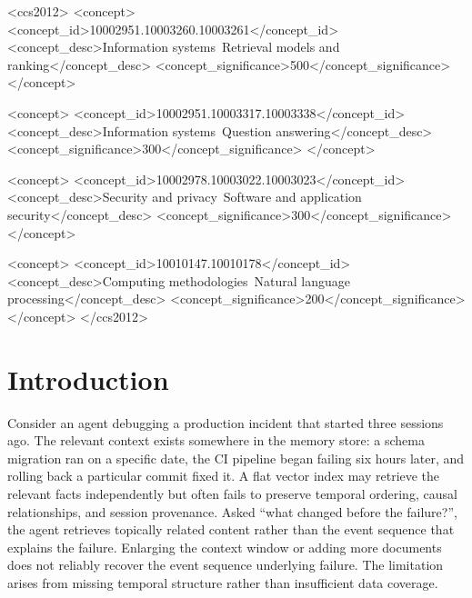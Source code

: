 \documentclass[sigconf]{acmart}
\begin{document}
\begin{CCSXML}
<ccs2012>
 <concept>
  <concept_id>10002951.10003260.10003261</concept_id>
  <concept_desc>Information systems~Retrieval models and ranking</concept_desc>
  <concept_significance>500</concept_significance>
 </concept>

 <concept>
  <concept_id>10002951.10003317.10003338</concept_id>
  <concept_desc>Information systems~Question answering</concept_desc>
  <concept_significance>300</concept_significance>
 </concept>

 <concept>
  <concept_id>10002978.10003022.10003023</concept_id>
  <concept_desc>Security and privacy~Software and application security</concept_desc>
  <concept_significance>300</concept_significance>
 </concept>

 <concept>
  <concept_id>10010147.10010178</concept_id>
  <concept_desc>Computing methodologies~Natural language processing</concept_desc>
  <concept_significance>200</concept_significance>
 </concept>
</ccs2012>
\end{CCSXML}


\maketitle

\section{Introduction}

Consider an agent debugging a production incident that started three
sessions ago. The relevant context exists somewhere in the memory store:
a schema migration ran on a specific date, the CI pipeline began failing
six hours later, and rolling back a particular commit fixed it. A flat vector index may retrieve the relevant facts independently but often fails to preserve temporal ordering, causal relationships, and session provenance. Asked ``what changed before the
failure?'', the agent retrieves topically related content rather than the
event sequence that explains the failure. Enlarging the context window or adding more documents does not reliably recover the event sequence underlying failure. The limitation arises from missing temporal structure rather than insufficient data coverage.
\end{document}
